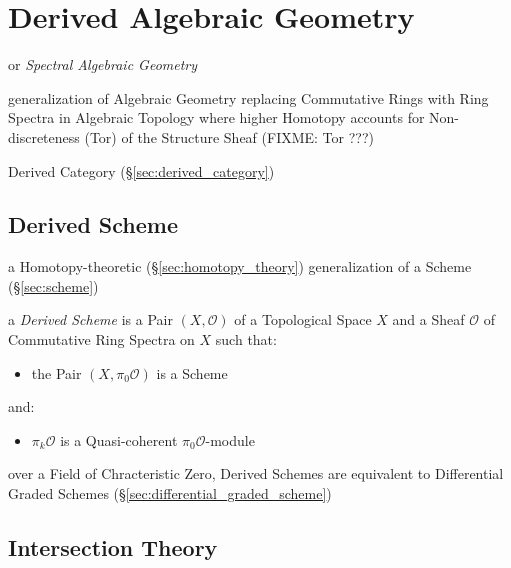 \section{Derived Algebraic Geometry}\label{sec:intersection_theory}

or \emph{Spectral Algebraic Geometry}

generalization of Algebraic Geometry replacing Commutative Rings with Ring
Spectra in Algebraic Topology where higher Homotopy accounts for
Non-discreteness (Tor) of the Structure Sheaf
(FIXME: Tor ???)

Derived Category (\S\ref{sec:derived_category})



\subsection{Derived Scheme}\label{sec:derived_scheme}

a Homotopy-theoretic (\S\ref{sec:homotopy_theory}) generalization of a Scheme
(\S\ref{sec:scheme})

a \emph{Derived Scheme} is a Pair $(X, \mathcal{O})$ of a Topological Space $X$
and a Sheaf $\mathcal{O}$ of Commutative Ring Spectra on $X$ such that:
\begin{itemize}
\item the Pair $(X, \pi_0\mathcal{O})$ is a Scheme
\end{itemize}
and:
\begin{itemize}
\item $\pi_k\mathcal{O}$ is a Quasi-coherent $\pi_0\mathcal{O}$-module
\end{itemize}

over a Field of Chracteristic Zero, Derived Schemes are equivalent to
Differential Graded Schemes (\S\ref{sec:differential_graded_scheme})



\subsection{Intersection Theory}\label{sec:intersection_theory}

